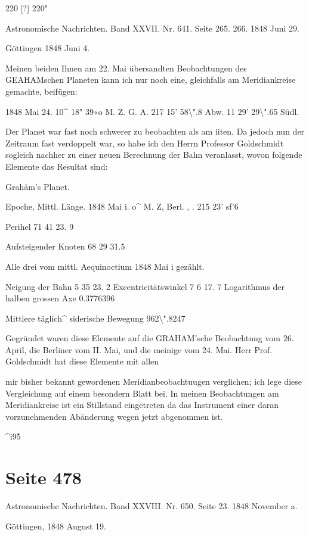 \documentclass[10pt,a4paper]{article}
\begin{document}
220 [?] 220"

Astronomische Nachrichten. Band XXVII. Nr. 641. Seite 265. 266. 1848 Juni 29.

Göttingen 1848 Juni 4.

Meinen beiden Ihnen am 22. Mai übersandten Beobachtungen des GEAHAMschen Planeten kann ich nur noch eine, gleichfalls am Meridiankreise gemachte, beifügen:

1848 Mai 24. 10\textasciicircum{} 18" 39«o M. Z. G. A. 217\textdegree{} 15' 58\textbackslash{}".8 Abw. 11\textdegree{} 29' 29\textbackslash{}".65 Südl.

Der Planet war fast noch schwerer zu beobachten als am iiten. Da jedoch nun der Zeitraum fast verdoppelt war, so habe ich den Herrn Professor Goldschmidt sogleich nachher zu einer neuen Berechnung der Bahn veranlasst, wovon folgende Elemente das Resultat sind:

Grahäm's Planet.

Epoche, Mittl. Länge. 1848 Mai i. o\textasciicircum{} M. Z, Berl. , . 215\textdegree{} 23' sf'6

Perihel 71 41 23. 9

Aufsteigender Knoten 68 29 31.5

Alle drei vom mittl. Aequinoctium 1848 Mai i gezählt.

Neigung der Bahn 5 35 23. 2 Excentricitätswinkel 7 6 17. 7 Logarithmus der halben grossen Axe 0.3776396

Mittlere täglich\textasciicircum{} siderische Bewegung 962\textbackslash{}".8247

Gegründet waren diese Elemente auf die GRAHAM'sche Beobachtung vom 26. April, die Berliner vom II. Mai, und die meinige vom 24. Mai. Herr Prof. Goldschmidt hat diese Elemente mit allen

mir bisher bekannt gewordenen Meridianbeobachtuugen verglichen; ich lege diese Vergleichung auf einem besondern Blatt bei. In meinen Beobachtungen am Meridiankreise ist ein Stillstand eingetreten da das Instrument einer daran vorzunehmenden Abänderung wegen jetzt abgenommen ist.

\textasciicircum{}i95


\newpage
\section*{Seite 478}
Astronomische Nachrichten. Band XXVIII. Nr. 650. Seite 23. 1848 November a.

Göttingen, 1848 August 19.
\end{document}
